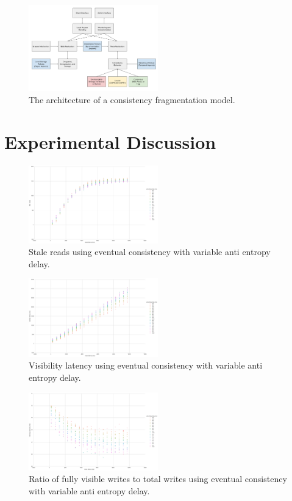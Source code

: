 \documentclass[letterpaper,twocolumn,10pt]{article}
\begin{document}
\begin{figure}[h]
    \centering
    \includegraphics[width=0.5\textwidth]{figures/architecture}
    \caption{The architecture of a consistency fragmentation model.}
\end{figure}

\section{Experimental Discussion}

\begin{figure}[h]
    \centering
    \includegraphics[width=0.5\textwidth]{figures/ae_stale_reads}
    \caption{Stale reads using eventual consistency with variable anti entropy delay.}
\end{figure}

\begin{figure}[h]
    \centering
    \includegraphics[width=0.5\textwidth]{figures/ae_viz_latency}
    \caption{Visibility latency using eventual consistency with variable anti entropy delay.}
\end{figure}

\begin{figure}[h]
    \centering
    \includegraphics[width=0.5\textwidth]{figures/ae_viz_ratio}
    \caption{Ratio of fully visible writes to total writes using eventual consistency with variable anti entropy delay.}
\end{figure}
\end{document}
